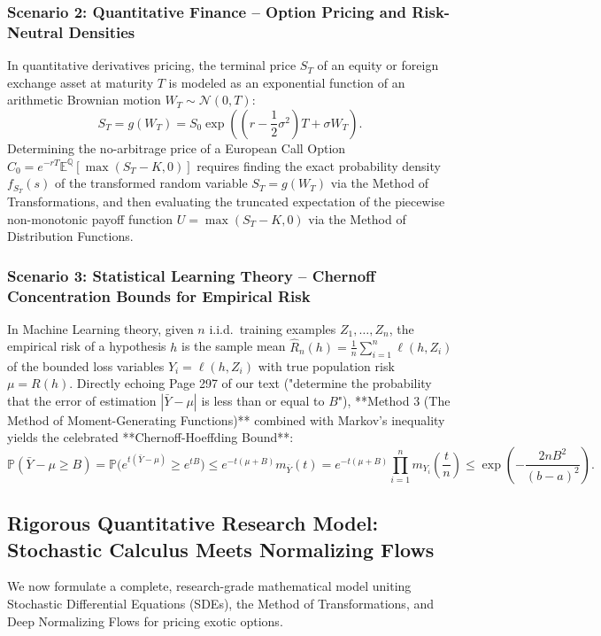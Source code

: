 \documentclass[11pt, letterpaper]{article}
\theoremstyle{definition}
\theoremstyle{remark}
\newcommand{\E}{\mathbb{E}}
\newcommand{\Prob}{\mathbb{P}}
\begin{document}
\begin{itemize}
\subsubsection*{Scenario 2: Quantitative Finance -- Option Pricing and Risk-Neutral Densities}
In quantitative derivatives pricing, the terminal price $S_T$ of an equity or foreign exchange asset at maturity $T$ is modeled as an exponential function of an arithmetic Brownian motion $W_T \sim \mathcal{N}(0, T)$:
\[
    S_T = g(W_T) = S_0 \exp\left(\left(r - \frac{1}{2}\sigma^2\right)T + \sigma W_T\right).
\]
Determining the no-arbitrage price of a European Call Option $C_0 = e^{-rT}\E^{\mathbb{Q}}[\max(S_T - K, 0)]$ requires finding the exact probability density $f_{S_T}(s)$ of the transformed random variable $S_T = g(W_T)$ via the Method of Transformations, and then evaluating the truncated expectation of the piecewise non-monotonic payoff function $U = \max(S_T - K, 0)$ via the Method of Distribution Functions.

\subsubsection*{Scenario 3: Statistical Learning Theory -- Chernoff Concentration Bounds for Empirical Risk}
In Machine Learning theory, given $n$ i.i.d.\ training examples $Z_1, \dots, Z_n$, the empirical risk of a hypothesis $h$ is the sample mean $\hat{R}_n(h) = \frac{1}{n}\sum_{i=1}^n \ell(h, Z_i)$ of the bounded loss variables $Y_i = \ell(h, Z_i)$ with true population risk $\mu = R(h)$. Directly echoing Page 297 of our text ("determine the probability that the error of estimation $|\bar{Y} - \mu|$ is less than or equal to $B$"), **Method 3 (The Method of Moment-Generating Functions)** combined with Markov's inequality yields the celebrated **Chernoff-Hoeffding Bound**:
\[
    \Prob(\bar{Y} - \mu \ge B) = \Prob\big(e^{t(\bar{Y} - \mu)} \ge e^{tB}\big) \le e^{-t(\mu + B)} m_{\bar{Y}}(t) = e^{-t(\mu + B)} \prod_{i=1}^n m_{Y_i}\left(\frac{t}{n}\right) \le \exp\left(-\frac{2nB^2}{(b-a)^2}\right).
\]

\subsection{Rigorous Quantitative Research Model: Stochastic Calculus Meets Normalizing Flows}

We now formulate a complete, research-grade mathematical model uniting Stochastic Differential Equations (SDEs), the Method of Transformations, and Deep Normalizing Flows for pricing exotic options.


\end{itemize}
\end{document}
